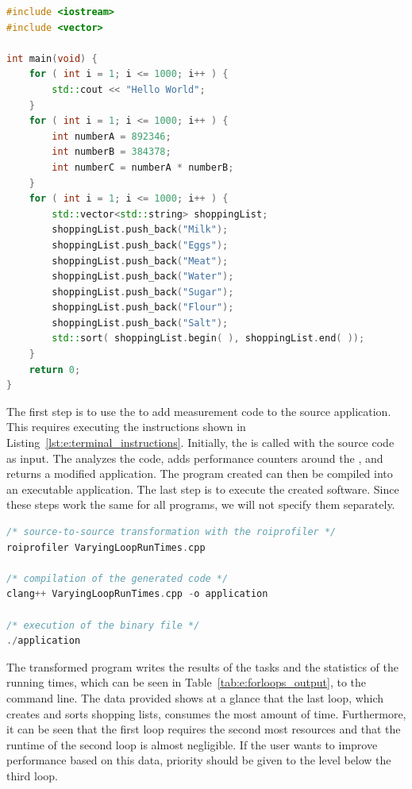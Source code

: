 \begin{lstlisting}[float, language=C++, caption=\CPP Code Showing the \VARYINGLOOP Application., label=lst:e:perf_forloops]
#include <iostream>
#include <vector>

int main(void) {
    for ( int i = 1; i <= 1000; i++ ) {
        std::cout << "Hello World";
    }
    for ( int i = 1; i <= 1000; i++ ) {
        int numberA = 892346;
        int numberB = 384378;
        int numberC = numberA * numberB;
    }
    for ( int i = 1; i <= 1000; i++ ) {
        std::vector<std::string> shoppingList;
        shoppingList.push_back("Milk");
        shoppingList.push_back("Eggs");
        shoppingList.push_back("Meat");
        shoppingList.push_back("Water");
        shoppingList.push_back("Sugar");
        shoppingList.push_back("Flour");
        shoppingList.push_back("Salt");
        std::sort( shoppingList.begin( ), shoppingList.end( ));
    }
    return 0;
}
\end{lstlisting} 

The first step is to use the \TOOL to add measurement code to the source application. This requires executing the instructions shown in Listing~\ref{lst:e:terminal_instructions}. Initially, the \TOOL is called with the source code as input. The \TOOL analyzes the code, adds performance counters around the \roismall, and returns a modified \CPP application. The program created can then be compiled into an executable application. The last step is to execute the created software. Since these steps work the same for all programs, we will not specify them separately.

\begin{lstlisting}[float, language=C++, caption={Instructions for Transformation, Compilation and Execution.}, label=lst:e:terminal_instructions]
/* source-to-source transformation with the roiprofiler */
roiprofiler VaryingLoopRunTimes.cpp

/* compilation of the generated code */
clang++ VaryingLoopRunTimes.cpp -o application

/* execution of the binary file */
./application
\end{lstlisting} 

The transformed program writes the results of the tasks and the statistics of the running times, which can be seen in Table~\ref{tab:e:forloops_output}, to the command line. The data provided shows at a glance that the last loop, which creates and sorts shopping lists, consumes the most amount of time. Furthermore, it can be seen that the first loop requires the second most resources and that the runtime of the second loop is almost negligible. If the user wants to improve performance based on this data, priority should be given to the level below the third loop.

